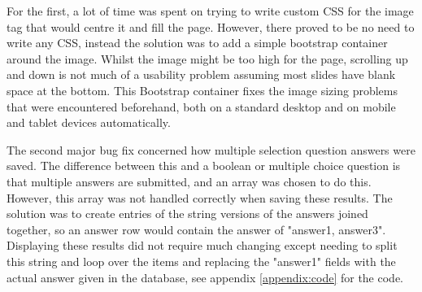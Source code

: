 For the first, a lot of time was spent on trying to write custom CSS for the image tag that would centre it and fill the page. However, there proved to be no need to write any CSS, instead the solution was to add a simple bootstrap container around the image. Whilst the image might be too high for the page, scrolling up and down is not much of a usability problem assuming most slides have blank space at the bottom. This Bootstrap container fixes the image sizing problems that were encountered beforehand, both on a standard desktop and on mobile and tablet devices automatically.

The second major bug fix concerned how multiple selection question answers were saved. The difference between this and a boolean or multiple choice question is that multiple answers are submitted, and an array was chosen to do this. However, this array was not handled correctly when saving these results. The solution was to create entries of the string versions of the answers joined together, so an answer row would contain the answer of "answer1, answer3". Displaying these results did not require much changing except needing to split this string and loop over the items and replacing the "answer1" fields with the actual answer given in the database, see appendix \ref{appendix:code} for the code.
\newpage